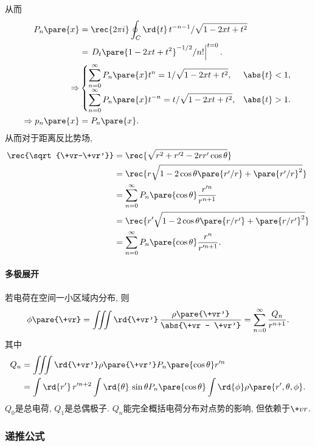 \documentclass[hidelinks]{ctexart}
\begin{document}
从而
\begin{align*}
    P_n\pare{x} &= \rec{2\pi i}\oint_C \rd{t}\, t^{-n-1}/\sqrt{1-2xt + t^2} \\
    &= \left.D_t\pare{1-2xt + t^2}^{-1/2}/n!\right\vert^{t=0}. \\
    \Rightarrow & \begin{cases}
        \displaystyle \sum_{n=0}^\infty P_n\pare{x}t^n = 1/\sqrt{1-2xt + t^2}, & \abs{t}<1,\\
        \displaystyle \sum_{n=0}^\infty P_n\pare{x}t^{-n} = t/\sqrt{1-2xt+t^2}, & \abs{t}>1.
    \end{cases}\\
    \Rightarrow p_n\pare{x} &= P_n\pare{x}.
\end{align*}
从而对于距离反比势场,
\begin{align*}
    \rec{\sqrt{\+vr-\+vr'}} &= \rec{\sqrt{r^2 + r'^2 - 2rr'\cos\theta}} \\
    &= \rec{r \sqrt{1-2\cos\theta\pare{r'/r} + \pare{r'/r}^2}} \\
    &= \sum_{n=0}^\infty P_n\pare{\cos\theta} \frac{r'^n}{r^{n+1}} \\
    &= \rec{r'\sqrt{1-2\cos\theta\pare{r/r'} + \pare{r/r'}^2}} \\
    &= \sum_{n=0}^\infty P_n\pare{\cos\theta} \frac{r^n}{r'^{n+1}}.
\end{align*}

\paragraph{多极展开} %
\label{par:多极展开}

若电荷在空间一小区域内分布, 则
\[ \phi\pare{\+vr} = \iiint \rd{\+vr'} \, \frac{\rho\pare{\+vr'}}{\abs{\+vr - \+vr'}} = \sum_{n=0}^\infty \frac{Q_n}{r^{n+1}}. \]
其中
\begin{align*}
    Q_n &= \iiint \rd{\+vr'} \rho\pare{\+vr'}P_n\pare{\cos\theta} r'^n \\
    &= \int \rd{r'}\, r'^{n+2} \int\rd{\theta}\,\sin\theta P_n\pare{\cos\theta} \int\rd{\phi}\rho\pare{r',\theta,\phi}.
\end{align*}
$Q_0$是总电荷, $Q_1$是总偶极子. $Q_n$能完全概括电荷分布对点势的影响, 但依赖于$\+vr$.


\subsubsection{递推公式} %
\label{ssub:递推公式}
\end{document}
